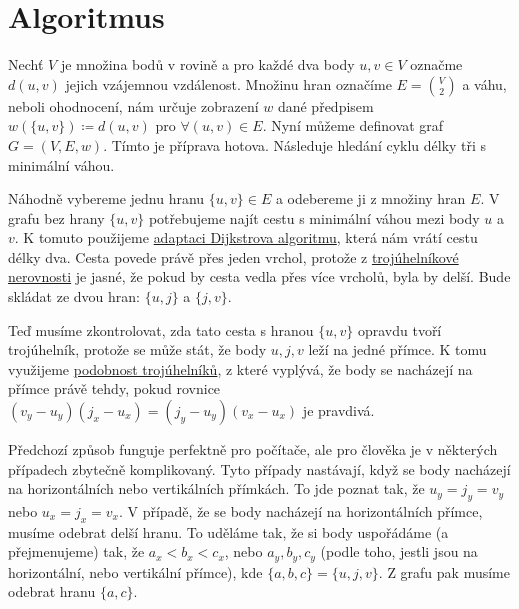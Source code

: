 \section{Algoritmus}
\label{sec:algoritmus}

Nechť $V$ je množina bodů v rovině a pro každé dva body $u, v \in V$ označme $d(u, v)$ jejich vzájemnou vzdálenost. Množinu hran označíme $E = \binom{V}{2}$ a váhu, neboli ohodnocení, nám určuje zobrazení $w$ dané předpisem $w(\{u, v\}) \coloneqq d(u, v)$ pro $\forall (u, v) \in E$. Nyní můžeme definovat graf $G = (V, E, w)$.
Tímto je příprava hotova. Následuje hledání cyklu délky tři s minimální váhou.



Náhodně vybereme jednu hranu $\{u, v\} \in E$ a odebereme ji z množiny hran $E$. V grafu bez hrany $\{u, v\}$ potřebujeme najít cestu s minimální váhou mezi body $u$ a  $v$. K tomuto použijeme \hyperref[subsec:dijkstra_adaptace]{adaptaci Dijkstrova algoritmu}, která nám vrátí cestu délky dva. Cesta povede právě přes jeden vrchol, protože z \hyperref[definice:trojuhelnikova_nerovnost]{trojúhelníkové nerovnosti} je jasné, že pokud by cesta vedla přes více vrcholů, byla by delší. Bude skládat ze dvou hran: $\{u, j\}$ a $\{j, v\}$.

Teď musíme zkontrolovat, zda tato cesta s hranou $\{u, v\}$ opravdu tvoří trojúhelník, protože se může  stát, že body $u, j, v$ leží na jedné přímce. K tomu využijeme \hyperref[sec:podobnost]{podobnost trojúhelníků}, z které vyplývá, že body se nacházejí na přímce právě tehdy, pokud rovnice $(v_y - u_y)(j_x - u_x) = (j_y - u_y)(v_x - u_x)$ je pravdivá. 

\begin{poznamka}
Předchozí způsob funguje perfektně pro počítače, ale pro člověka je v některých případech zbytečně komplikovaný. Tyto případy nastávají, když se body nacházejí na horizontálních nebo vertikálních přímkách. To jde poznat tak, že $u_y = j_y = v_y$ nebo $u_x = j_x = v_x$.
V případě, že se body nacházejí na horizontálních přímce, musíme odebrat delší hranu. To uděláme tak, že si body uspořádáme (a přejmenujeme) tak, že $a_x<b_x<c_x$, nebo $a_y, b_y, c_y$ (podle toho, jestli jsou na horizontální, nebo vertikální přímce), kde $\{a, b, c\} = \{u, j, v\}$. Z grafu pak musíme odebrat hranu $\{a, c\}$.
\end{poznamka}


